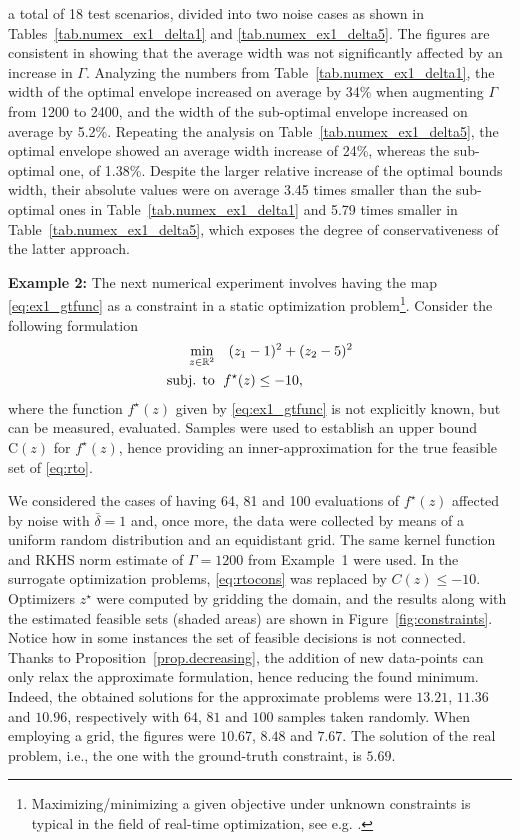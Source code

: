 a total of 18 test scenarios, divided into two noise cases as shown in Tables~\ref{tab.numex_ex1_delta1} and \ref{tab.numex_ex1_delta5}. The figures are consistent in showing that the average width was not significantly affected by an increase in $\Gamma$. Analyzing the numbers from Table~\ref{tab.numex_ex1_delta1}, the width of the optimal envelope  increased on average by 34\% when augmenting $\Gamma$ from 1200 to 2400, and the width of the sub-optimal envelope increased on average by 5.2\%. Repeating the analysis on Table~\ref{tab.numex_ex1_delta5}, the optimal envelope showed an average width increase of 24\%, whereas the sub-optimal one, of 1.38\%. Despite the larger relative increase of the optimal bounds width, their absolute values were on average 3.45 times smaller than the sub-optimal ones in Table~\ref{tab.numex_ex1_delta1} and 5.79 times smaller in Table~\ref{tab.numex_ex1_delta5}, which exposes the degree of conservativeness of the latter approach.

\textbf{Example 2:} The next numerical experiment involves having the map \eqref{eq:ex1_gtfunc} as a constraint in a static optimization problem\footnote{Maximizing/minimizing a given objective under unknown constraints is typical in the field of real-time optimization, see e.g. \citep{chachuat2009adaptation}.}. Consider the following formulation
\begin{subequations}
	\label{eq:rto}
	\begin{align}
		\min_{z \in \mathbb{R}^2} & \quad (z_1-1)^2 + (z_2-5)^2  \\ 
		\text{\normalfont subj. to} & \ \; 
		f^\star(z) \le -10, \label{eq:rtocons}
	\end{align}
\end{subequations}
where the function $f^\star(z)$ given by \eqref{eq:ex1_gtfunc} is not explicitly known, but can be measured, evaluated. Samples were used to establish an upper bound $\text{C}(z)$ for $f^\star(z)$, hence providing an inner-approximation for the true feasible set of \eqref{eq:rto}. 

We considered the cases of having 64, 81 and 100 evaluations of $f^\star(z)$ affected by noise with $\bar\delta=1$ and, once more, the data were collected by means of a uniform random distribution and an equidistant grid. The same kernel function and RKHS norm estimate of $\Gamma=1200$ from Example~1 were used. In the surrogate optimization problems, \eqref{eq:rtocons} was replaced by $C(z)\le -10$. Optimizers $z^\star$ were computed by gridding the domain, and the results along with the estimated feasible sets (shaded areas) are shown in Figure~\ref{fig:constraints}. Notice how in some instances the set of feasible decisions is not connected. Thanks to Proposition~\ref{prop.decreasing}, the addition of new data-points can only relax the approximate formulation, hence reducing the found minimum.
Indeed, the obtained solutions for the approximate problems were $13.21$, $11.36$ and $10.96$, respectively with $64$, $81$ and $100$ samples taken randomly. When employing a grid, the figures were $10.67$, $8.48$ and $7.67$. The solution of the real problem, i.e., the one with the ground-truth constraint, is $5.69$.

